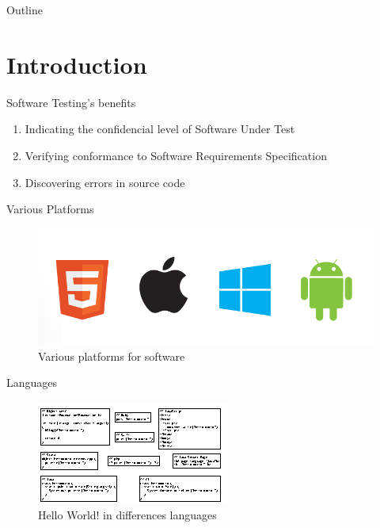 \documentclass{beamer}
\title{\ThesisNameEN}
\subtitle{IMECS2017}
\date[2017.03.14]{\today}
\author{\authorNameEN~\small{and~\advisorEn}}
\institute{{\facultyEn}, {\universityEn}}
\begin{document}
\maketitle

\begin{frame}[t]{Outline}
    \tableofcontents[hideallsubsections]
\end{frame}

%
\section{Introduction}
\begin{frame}{Software Testing's benefits}
  \begin{enumerate}
     \item Indicating the confidencial level of Software Under Test
     \item Verifying conformance to Software Requirements Specification
     \item Discovering errors in source code
  \end{enumerate}
\end{frame}

\begin{frame}{Various Platforms}
    \begin{figure}
        \includegraphics[width=.8\paperwidth]{figure/mobile_bugs}
        \caption{Various platforms for software}
        \label{fig:variousplatform}
    \end{figure}
\end{frame}

\begin{frame}{Languages}
    \begin{figure}
        \includegraphics[width=.9\paperwidth]{figure/hello-world-lang}
        \caption{Hello World! in differences languages}
        \label{fig:helloworld}
    \end{figure}
\end{frame}
\end{document}
